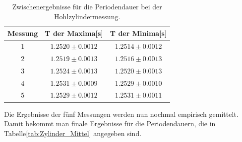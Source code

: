 \documentclass[12pt,a4paper]{article}
\begin{document}
\begin{table}[H]
\caption{Zwischenergebnisse für die Periodendauer bei der Hohlzylindermessung.}
\begin{center}
\begin{tabular}{|c|c|c|}
\hline
Messung & T der Maxima[s] & T der Minima[s]  \\
\hline
1  & $ 1.2520 \pm  0.0012 $ & $ 1.2514 \pm  0.0012 $ \\
\hline
2  & $ 1.2519 \pm  0.0013 $ & $ 1.2516 \pm  0.0013 $ \\
\hline
3  & $ 1.2524 \pm  0.0013 $ & $ 1.2520 \pm  0.0013 $ \\
\hline
4  & $ 1.2531 \pm  0.0009 $ & $ 1.2529 \pm  0.0010 $ \\
\hline
5  & $ 1.2529 \pm  0.0012 $ & $ 1.2531 \pm  0.0011 $ \\
\hline
\end{tabular}
\end{center}
\label{tab:Hohl_Ergebnisse}
\end{table}

Die Ergebnisse der fünf Messungen werden nun nochmal empirisch gemittelt.
Damit bekommt man finale Ergebnisse für die Periodendauern, die in Tabelle\ref{tab:Zylinder_Mittel} angegeben sind.
\end{document}
